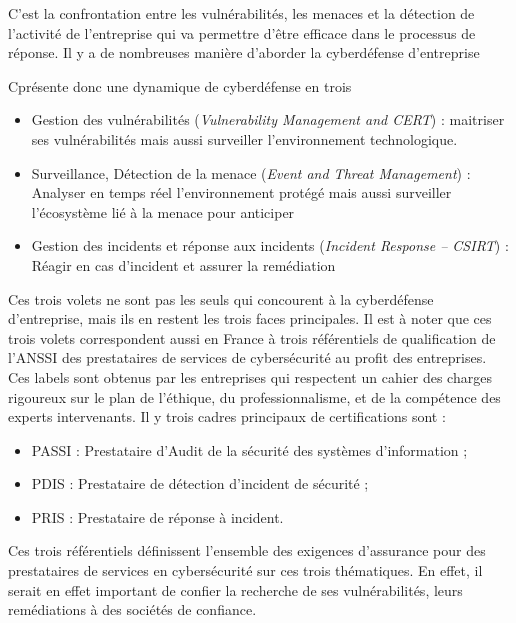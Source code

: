C’est la confrontation entre les vulnérabilités, les menaces et la détection de l’activité de l’entreprise qui va permettre d’être efficace dans le processus de réponse. Il y a de nombreuses manière d’aborder la cyberdéfense d’entreprise

C\edoc présente donc une dynamique de cyberdéfense en trois

\begin{itemize}
\item Gestion des vulnérabilités (\textit{Vulnerability Management and CERT}) : maitriser ses vulnérabilités mais aussi surveiller l’environnement technologique. 
\item Surveillance, Détection de la menace (\textit{Event and Threat Management}) : Analyser en temps réel l’environnement protégé mais aussi surveiller l’écosystème lié à la menace pour anticiper 
\item Gestion des incidents et réponse aux incidents (\textit{Incident Response – CSIRT}) : Réagir en cas d’incident et assurer la remédiation
\end{itemize}


Ces trois volets ne sont pas les seuls qui concourent à la cyberdéfense d’entreprise, mais ils en restent les trois faces principales. Il est à noter que ces trois volets correspondent aussi en France à trois référentiels de qualification de l’ANSSI des prestataires de services de cybersécurité au profit des entreprises. Ces labels sont obtenus par les entreprises qui respectent un cahier des charges rigoureux sur le plan de l'éthique, du professionnalisme, et de la compétence des experts intervenants. Il y trois cadres principaux de certifications sont :

\begin{itemize}
\item PASSI : Prestataire d’Audit de la sécurité des systèmes d’information ;
\item PDIS : Prestataire de détection d’incident de sécurité ;
\item PRIS : Prestataire de réponse à incident.
\end{itemize}

Ces trois référentiels définissent l’ensemble des exigences d’assurance pour des prestataires de services en cybersécurité sur ces trois thématiques. En effet, il serait en effet important de confier la recherche de ses vulnérabilités, leurs remédiations à des sociétés de confiance. 

